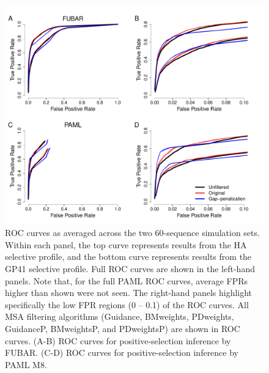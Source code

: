 \documentclass[11pt]{article}
\begin{document}
\begin{figure}[H]
\centerline{\includegraphics[width=6in]{Figures/ROC_prk.pdf}}
\caption{\label{roc} ROC curves as averaged across the two 60-sequence simulation sets. Within each panel, the top curve represents results from the HA selective profile, and the bottom curve represents results from the GP41 selective profile. Full ROC curves are shown in the left-hand panels. Note that, for the full PAML ROC curves, average FPRs higher than shown were not seen. The right-hand panels highlight specifically the low FPR regions (0 -- 0.1) of the ROC curves. All MSA filtering algorithms (Guidance, BMweights, PDweights, GuidanceP, BMweightsP, and PDweightsP) are shown in ROC curves. (A-B) ROC curves for positive-selection inference by FUBAR. (C-D) ROC curves for positive-selection inference by PAML M8.}
\end{figure}
\end{document}
